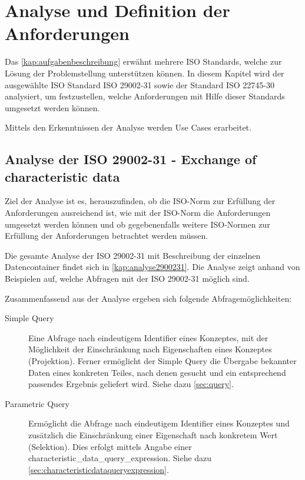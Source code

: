 \chapter{Analyse und Definition der Anforderungen } \label{kap:analyse_und_definition}

Das \autoref{kap:aufgabenbeschreibung} erwähnt mehrere ISO Standards, welche zur Lösung der Problemstellung unterstützen können. In diesem Kapitel wird der ausgewählte ISO Standard ISO 29002-31 sowie der Standard ISO 22745-30 analysiert, um festzustellen, welche Anforderungen mit Hilfe dieser Standards umgesetzt werden können. 

Mittels den Erkenntnissen der Analyse werden Use Cases erarbeitet. 

\section{Analyse der ISO 29002-31 - Exchange of characteristic data}\label{kap:analyseiso2900231}

Ziel der Analyse ist es, herauszufinden, ob die ISO-Norm zur Erfüllung der Anforderungen ausreichend ist, wie mit der ISO-Norm die Anforderungen umgesetzt werden können und ob gegebenenfalls weitere ISO-Normen zur Erfüllung der Anforderungen betrachtet werden müssen. 

Die gesamte Analyse der ISO 29002-31 mit Beschreibung der einzelnen Datencontainer findet sich in \autoref{kap:analyse2900231}. Die Analyse zeigt anhand von Beispielen auf, welche Abfragen mit der ISO 29002-31 möglich sind.

Zusammenfassend aus der Analyse ergeben sich folgende Abfragemöglichkeiten:
\begin{description}
\item[Simple Query] Eine Abfrage nach eindeutigem Identifier eines Konzeptes, mit der Möglichkeit der Einschränkung nach Eigenschaften eines Konzeptes (Projektion). Ferner ermöglicht der Simple Query die Übergabe bekannter Daten eines konkreten Teiles, nach denen gesucht und ein entsprechend passendes Ergebnis geliefert wird. Siehe dazu \autoref{sec:query}.
\item[Parametric Query] Ermöglicht die Abfrage nach eindeutigem Identifier eines Konzeptes und zusätzlich die Einschränkung einer Eigenschaft nach konkretem Wert (Selektion). Dies erfolgt mittels Angabe einer characteristic\_data\_query\_expression. Siehe dazu \autoref{sec:characteristicdataqueryexpression}.
\end{description}

